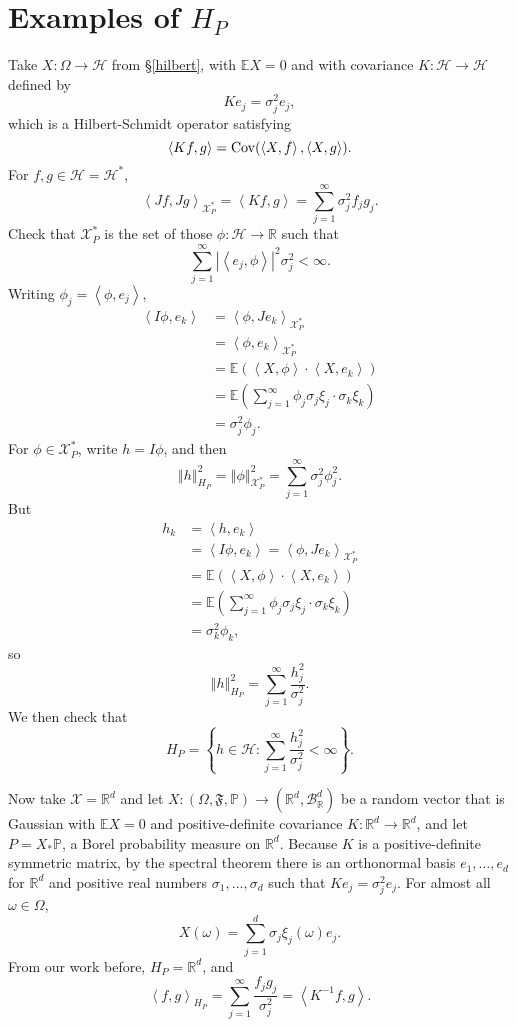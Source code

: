 \documentclass{article}
\newcommand{\inner}[2]{\left\langle #1, #2 \right\rangle}
\newcommand{\Cov}{\ensuremath\mathrm{Cov}}
\newcommand{\norm}[1]{\left\Vert #1 \right\Vert}
\theoremstyle{definition}
\begin{document}
\section{Examples of $H_P$}
Take $X:\Omega \to \mathscr{H}$ from \S \ref{hilbert}, with $\mathbb{E} X = 0$ and 
with covariance
 $K:\mathscr{H} \to \mathscr{H}$ defined by
\[
Ke_j = \sigma_j^2 e_j,
\]
which is a Hilbert-Schmidt operator satisfying
\[
\inner{Kf}{g} = \Cov(\inner{X}{f},\inner{X}{g}).
\]
For $f,g \in \mathscr{H} = \mathscr{H}^*$,
\[
\inner{Jf}{Jg}_{\mathscr{X}_P^*}
=\inner{Kf}{g}
=\sum_{j=1}^\infty \sigma_j^2 f_j g_j.
\]
Check that
$\mathscr{X}_P^*$ is the set of those $\phi:\mathscr{H} \to \mathbb{R}$ such that 
\[
\sum_{j=1}^\infty |\inner{e_j}{\phi}|^2 \sigma_j^2 < \infty.
\]
Writing $\phi_j = \inner{\phi}{e_j}$,
\begin{align*}
\inner{I\phi}{e_k} &= \inner{\phi}{Je_k}_{\mathscr{X}_P^*}\\
&=\inner{\phi}{e_k}_{\mathscr{X}_P^*}\\
&=\mathbb{E}(\inner{X}{\phi}\cdot \inner{X}{e_k})\\
&=\mathbb{E}\left( \sum_{j=1}^\infty \phi_j \sigma_j \xi_j \cdot
\sigma_k \xi_k\right)\\
&= \sigma_j^2 \phi_j.
\end{align*}
For $\phi \in \mathscr{X}_P^*$, write $h=I\phi$, and then
\[
\norm{h}_{H_P}^2 = \norm{\phi}_{\mathscr{X}_P^*}^2
=\sum_{j=1}^\infty \sigma_j^2 \phi_j^2.
\]
But
\begin{align*}
h_k&=\inner{h}{e_k}\\
&= \inner{I\phi}{e_k} = \inner{\phi}{Je_k}_{\mathscr{X}_P^*}\\
& = 
\mathbb{E}(\inner{X}{\phi}\cdot \inner{X}{e_k})\\
&=\mathbb{E}\left( \sum_{j=1}^\infty \phi_j \sigma_j \xi_j \cdot \sigma_k \xi_k\right)\\
&=\sigma_k^2 \phi_k,
\end{align*}
so
\[
\norm{h}_{H_P}^2 = \sum_{j=1}^\infty \frac{h_j^2}{\sigma_j^2}.
\]
We then check that
\[
H_P = \left\{ h \in \mathscr{H} : \sum_{j=1}^\infty \frac{h_j^2}{\sigma_j^2} < \infty\right\}.
\]


Now take $\mathscr{X}=\mathbb{R}^d$ and let $X:(\Omega,\mathfrak{F},\mathbb{P}) \to 
(\mathbb{R}^d,\mathscr{B}_{\mathbb{R}}^d)$ be a random vector that is Gaussian with $\mathbb{E} X=0$
and
positive-definite covariance $K:\mathbb{R}^d \to \mathbb{R}^d$,
and let $P=X_* \mathbb{P}$, a Borel probability measure on $\mathbb{R}^d$.
Because $K$ is a positive-definite symmetric matrix, 
by the spectral theorem there is an orthonormal basis $e_1,\ldots,e_d$ for $\mathbb{R}^d$
and positive real numbers $\sigma_1,\ldots,\sigma_d$ such that
$Ke_j = \sigma_j^2 e_j$. 
For almost all $\omega \in \Omega$,
\[
X(\omega) = \sum_{j=1}^d \sigma_j \xi_j(\omega) e_j.
\]
From our work before, $H_P = \mathbb{R}^d$, and
\[
\inner{f}{g}_{H_P} =\sum_{j=1}^\infty \frac{f_j g_j}{\sigma_j^2}
=\inner{K^{-1}f}{g}.
\]
\end{document}
